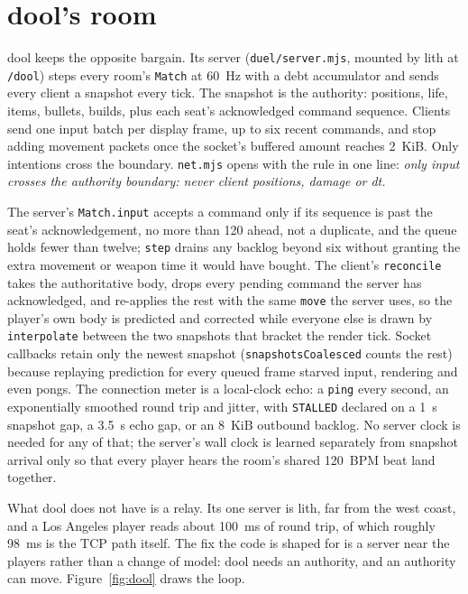 \documentclass[10pt,letterpaper,twocolumn]{article}
\newcommand{\code}[1]{\texttt{\nolinkurl{#1}}}
\begin{document}
\section{dool's room}\label{sec:dool}
dool keeps the opposite bargain. Its server (\code{duel/server.mjs}, mounted by lith at \code{/dool}) steps every room's \code{Match} at 60~Hz with a debt accumulator and sends every client a snapshot every tick. The snapshot is the authority: positions, life, items, bullets, builds, plus each seat's acknowledged command sequence. Clients send one input batch per display frame, up to six recent commands, and stop adding movement packets once the socket's buffered amount reaches 2~KiB. Only intentions cross the boundary. \code{net.mjs} opens with the rule in one line: \emph{only input crosses the authority boundary: never client positions, damage or dt.}

The server's \code{Match.input} accepts a command only if its sequence is past the seat's acknowledgement, no more than 120 ahead, not a duplicate, and the queue holds fewer than twelve; \code{step} drains any backlog beyond six without granting the extra movement or weapon time it would have bought. The client's \code{reconcile} takes the authoritative body, drops every pending command the server has acknowledged, and re-applies the rest with the same \code{move} the server uses, so the player's own body is predicted and corrected while everyone else is drawn by \code{interpolate} between the two snapshots that bracket the render tick. Socket callbacks retain only the newest snapshot (\code{snapshotsCoalesced} counts the rest) because replaying prediction for every queued frame starved input, rendering and even pongs. The connection meter is a local-clock echo: a \code{ping} every second, an exponentially smoothed round trip and jitter, with \code{STALLED} declared on a 1~s snapshot gap, a 3.5~s echo gap, or an 8~KiB outbound backlog. No server clock is needed for any of that; the server's wall clock is learned separately from snapshot arrival only so that every player hears the room's shared 120~BPM beat land together.

What dool does not have is a relay. Its one server is lith, far from the west coast, and a Los Angeles player reads about 100~ms of round trip, of which roughly 98~ms is the TCP path itself. The fix the code is shaped for is a server near the players rather than a change of model: dool needs an authority, and an authority can move. Figure~\ref{fig:dool} draws the loop.
\end{document}
